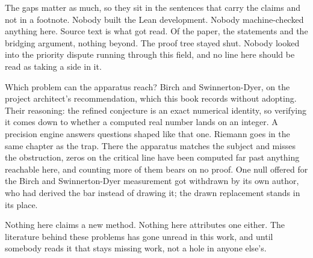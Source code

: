 The gaps matter as much, so they sit in the sentences that carry the claims and not in a footnote.
Nobody built the Lean development. Nobody machine-checked anything here. Source text is what got
read. Of the paper, the statements and the bridging argument, nothing beyond. The proof tree stayed
shut. Nobody looked into the priority dispute running through this field, and no line here should be
read as taking a side in it.

Which problem can the apparatus reach? Birch and Swinnerton-Dyer, on the project architect's
recommendation, which this book records without adopting. Their reasoning: the refined conjecture is
an exact numerical identity, so verifying it comes down to whether a computed real number lands on
an integer. A precision engine answers questions shaped like that one. Riemann goes in the same
chapter as the trap. There the apparatus matches the subject and misses the obstruction, zeros on
the critical line have been computed far past anything reachable here, and counting more of them
bears on no proof. One null offered for the Birch and Swinnerton-Dyer measurement got withdrawn by
its own author, who had derived the bar instead of drawing it; the drawn replacement stands in its
place.

Nothing here claims a new method. Nothing here attributes one either. The literature behind these
problems has gone unread in this work, and until somebody reads it that stays missing work, not a
hole in anyone else's.
\cleardoublepage
